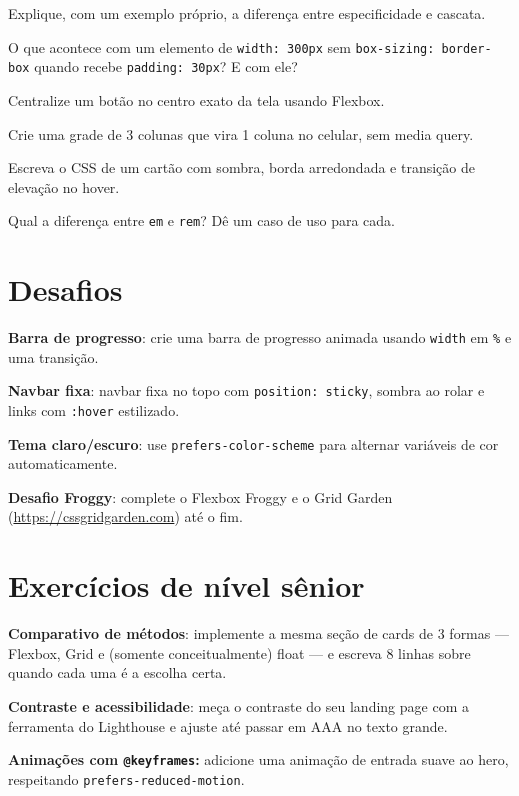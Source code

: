 \begin{exercicios}
  \item Explique, com um exemplo próprio, a diferença entre especificidade e cascata.
  \item O que acontece com um elemento de \texttt{width: 300px} sem
  \texttt{box-sizing: border-box} quando recebe \texttt{padding: 30px}? E com ele?
  \item Centralize um botão no centro exato da tela usando Flexbox.
  \item Crie uma grade de 3 colunas que vira 1 coluna no celular, sem media query.
  \item Escreva o CSS de um cartão com sombra, borda arredondada e transição de elevação no hover.
  \item Qual a diferença entre \texttt{em} e \texttt{rem}? Dê um caso de uso para cada.
\end{exercicios}

\section{Desafios}

\begin{desafios}
  \item \textbf{Barra de progresso}: crie uma barra de progresso animada usando
  \texttt{width} em \texttt{\%} e uma transição.
  \item \textbf{Navbar fixa}: navbar fixa no topo com \texttt{position: sticky},
  sombra ao rolar e links com \texttt{:hover} estilizado.
  \item \textbf{Tema claro/escuro}: use \texttt{prefers-color-scheme} para
  alternar variáveis de cor automaticamente.
  \item \textbf{Desafio Froggy}: complete o Flexbox Froggy e o Grid Garden
  (\url{https://cssgridgarden.com}) até o fim.
\end{desafios}

\section{Exercícios de nível sênior}

\begin{seniores}
  \item \textbf{Comparativo de métodos}: implemente a mesma seção de cards de
  3 formas — Flexbox, Grid e (somente conceitualmente) float — e escreva 8
  linhas sobre quando cada uma é a escolha certa.
  \item \textbf{Contraste e acessibilidade}: meça o contraste do seu landing
  page com a ferramenta do Lighthouse e ajuste até passar em AAA no texto grande.
  \item \textbf{Animações com \texttt{@keyframes}:} adicione uma animação de
  entrada suave ao hero, respeitando \texttt{prefers-reduced-motion}.
\end{seniores}

